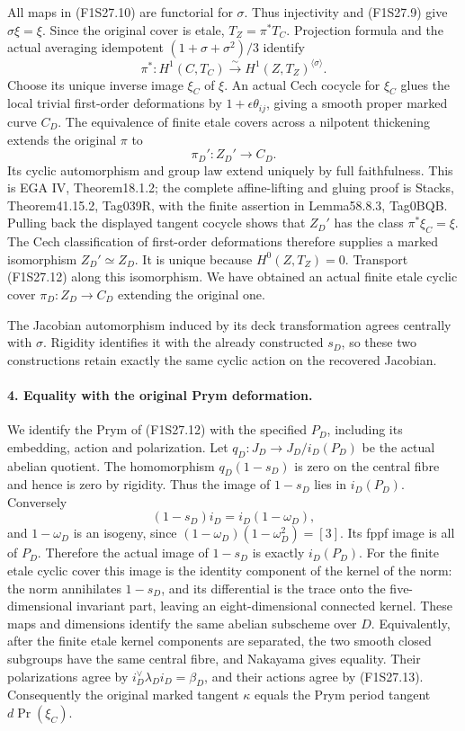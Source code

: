 All maps in (F1S27.10) are functorial for $\sigma$.
Thus injectivity and (F1S27.9) give $\sigma\xi=\xi$.
Since the original cover is etale,
$T_Z=\pi^*T_C$. Projection formula and the actual
averaging idempotent $(1+\sigma+\sigma^2)/3$ identify
\[
 \pi^*:H^1(C,T_C)\xrightarrow{\sim}H^1(Z,T_Z)^{\langle\sigma\rangle}.
 \tag{F1S27.11}
\]
Choose its unique inverse image $\xi_C$ of $\xi$.
An actual Cech cocycle for $\xi_C$ glues the local
trivial first-order deformations by $1+\epsilon\theta_{ij}$,
giving a smooth proper marked curve $C_D$.
The equivalence of finite etale covers across a nilpotent
thickening extends the original $\pi$ to
\[
                         \pi_D':Z_D'\longrightarrow C_D.
 \tag{F1S27.12}
\]
Its cyclic automorphism and group law extend uniquely
by full faithfulness. This is EGA IV, Theorem18.1.2;
the complete affine-lifting and gluing proof is Stacks,
Theorem41.15.2, Tag039R, with the finite assertion in
Lemma58.8.3, Tag0BQB.
Pulling back the displayed tangent cocycle shows that
$Z_D'$ has the class $\pi^*\xi_C=\xi$.
The Cech classification of first-order deformations
therefore supplies a marked isomorphism $Z_D'\simeq Z_D$.
It is unique because $H^0(Z,T_Z)=0$.
Transport (F1S27.12) along this isomorphism. We have
obtained an actual finite etale cyclic cover
$\pi_D:Z_D\to C_D$ extending the original one.

The Jacobian automorphism induced by its deck
transformation agrees centrally with $\sigma$.
Rigidity identifies it with the already constructed
$s_D$, so these two constructions retain exactly the
same cyclic action on the recovered Jacobian.

\paragraph{4. Equality with the original Prym deformation.}
We identify the Prym of (F1S27.12) with the specified
$P_D$, including its embedding, action and polarization.
Let $q_D:J_D\to J_D/i_D(P_D)$ be the actual abelian
quotient. The homomorphism $q_D(1-s_D)$ is zero on
the central fibre and hence is zero by rigidity.
Thus the image of $1-s_D$ lies in $i_D(P_D)$.
Conversely
\[
                  (1-s_D)i_D=i_D(1-\omega_D),
 \tag{F1S27.13}
\]
and $1-\omega_D$ is an isogeny, since
$(1-\omega_D)(1-\omega_D^2)=[3]$.
Its fppf image is all of $P_D$. Therefore the actual
image of $1-s_D$ is exactly $i_D(P_D)$.
For the finite etale cyclic cover this image is the
identity component of the kernel of the norm: the norm
annihilates $1-s_D$, and its differential is the trace
onto the five-dimensional invariant part, leaving an
eight-dimensional connected kernel. These maps and
dimensions identify the same abelian subscheme over $D$.
Equivalently, after the finite etale kernel components
are separated, the two smooth closed subgroups have the
same central fibre, and Nakayama gives equality.
Their polarizations agree by
$i_D^\vee\lambda_Di_D=\beta_D$, and their actions agree
by (F1S27.13).
Consequently the original marked tangent $\kappa$ equals
the Prym period tangent $d\operatorname{Pr}(\xi_C)$.

